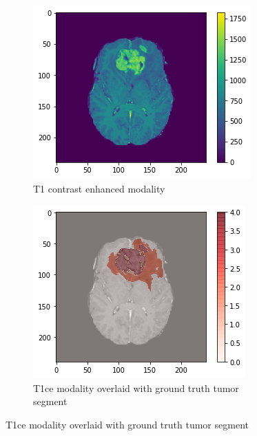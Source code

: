 \begin{figure}[H]
    \centering
    \begin{subfigure}{.33\textwidth}
        \centering
        \includegraphics[width=\linewidth]{chapters/07_brats3d/images/02_t1ce.png}
        \caption{T1 contrast enhanced modality}
    \end{subfigure}%
    \begin{subfigure}{.33\textwidth}
        \centering
        \includegraphics[width=\linewidth]{chapters/07_brats3d/images/06_t1ce_segment.png}
        \caption{T1ce modality overlaid with ground truth tumor segment}

\end{subfigure}
\end{figure}
